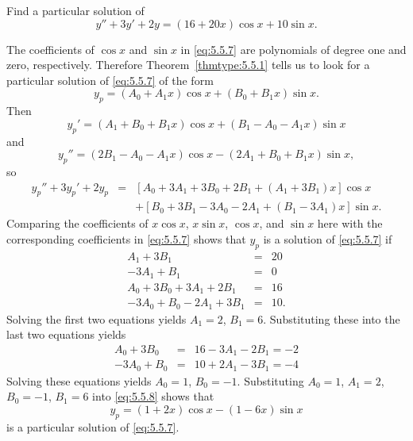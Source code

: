 \documentclass{ximera}
\begin{document}
\begin{example}\label{example:5.5.3}
Find a particular solution of
\begin{equation} \label{eq:5.5.7}
y''+3y'+2y=(16+20x)\cos x+10\sin x.
\end{equation}
 
\begin{explanation}
The coefficients of $\cos x$ and $\sin x$ in \eqref{eq:5.5.7} are
polynomials of degree one and zero, respectively. Therefore
Theorem~\ref{thmtype:5.5.1} tells us to look for a particular solution of
\eqref{eq:5.5.7} of the form
\begin{equation} \label{eq:5.5.8}
y_p=(A_0+A_1x)\cos x+(B_0+B_1x)\sin x.
\end{equation}
Then
\begin{equation} \label{eq:5.5.9}
y_p'=(A_1+B_0+B_1x)\cos x+(B_1-A_0-A_1x)\sin x
\end{equation}
and
\begin{equation} \label{eq:5.5.10}
 y_p''=(2B_1-A_0-A_1x)\cos x-(2A_1+B_0+B_1x)\sin x,
\end{equation}
so
\begin{equation} \label{eq:5.5.11}
\begin{array}{rcl}
y_p''+3y_p'+2y_p&=&\left[A_0+3 A_1+3 B_0+2 B_1+(A_1+3 B_1)x\right]\cos
x\\ &&+ \left[B_0+3 B_1-3 A_0-2 A_1+(B_1-3 A_1)x\right]\sin x.
\end{array}
\end{equation}
Comparing the coefficients of $x\cos x$, $x\sin x$, $\cos x$, and
$\sin x$ here with the corresponding coefficients in \eqref{eq:5.5.7}
shows that $y_p$ is a solution of \eqref{eq:5.5.7} if
$$
\begin{array}{rcr}
A_1+3B_1&=&20\\
-3A_1+B_1&=&0\\
A_0+3B_0+3A_1+2B_1&=&16\\
-3A_0+B_0-2A_1+3B_1&=&10.
\end{array}
$$
Solving the first two equations yields $A_1=2$, $B_1=6$.
Substituting these into the last two equations  yields
\begin{eqnarray*}
A_0+3B_0&=&16-3A_1-2B_1=-2\\
-3A_0+B_0&=&10+2A_1-3B_1=-4
 \end{eqnarray*}
Solving these equations yields $A_0=1$, $B_0=-1$.
Substituting $A_0=1$, $A_1=2$, $B_0=-1$, $B_1=6$ into
\eqref{eq:5.5.8} shows that
$$
y_p=(1+2x)\cos x-(1-6x)\sin x
$$
is a particular solution of  \eqref{eq:5.5.7}.
\end{explanation}
\end{example}
 
\end{document}
